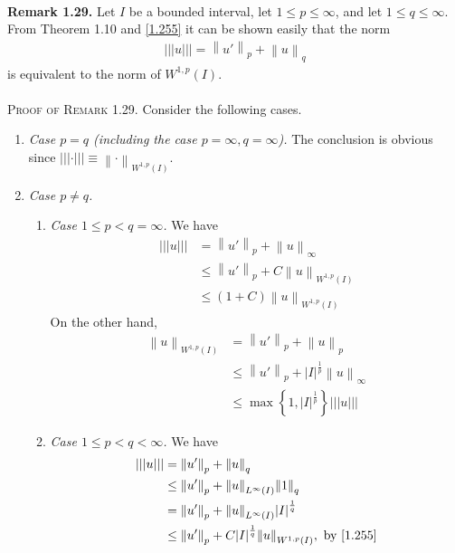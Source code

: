 \documentclass[a4paper,oneside]{book}
\numberwithin{equation}{chapter}
\begin{document}
\\
\textbf{Remark 1.29.} Let $I$ be a bounded interval, let $1\le p\le \infty$, and let $1\le q\le \infty$. From Theorem 1.10 and \eqref{1.255} it can be shown easily that the norm
\begin{align}
|||u||| = {\left\| {u'} \right\|_p} + {\left\| u \right\|_q}
\end{align}
is equivalent to the norm of $W^{1,p}\left(I\right)$.\\
\\
\textsc{Proof of Remark 1.29.} Consider the following cases.
\begin{enumerate}
\item \textit{Case $p=q$ (including the case $p=\infty,q=\infty$).} The conclusion is obvious since $||| \cdot ||| \equiv {\left\|  \cdot  \right\|_{{W^{1,p}}\left( I \right)}}$.
\item \textit{Case $p\ne q$. }
\begin{enumerate}
\item \textit{Case $1 \le p < q = \infty $.} We have
\begin{align}
|||u||| &= {\left\| {u'} \right\|_p} + {\left\| u \right\|_\infty }\\
& \le {\left\| {u'} \right\|_p} + C{\left\| u \right\|_{{W^{1,p}}\left( I \right)}}\\
& \le \left( {1 + C} \right){\left\| u \right\|_{{W^{1,p}}\left( I \right)}}
\end{align}
On the other hand,
\begin{align}
{\left\| u \right\|_{{W^{1,p}}\left( I \right)}} &= {\left\| {u'} \right\|_p} + {\left\| u \right\|_p}\\
& \le {\left\| {u'} \right\|_p} + {\left| I \right|^{\frac{1}{p}}}{\left\| u \right\|_\infty }\\
& \le \max \left\{ {1,{{\left| I \right|}^{\frac{1}{p}}}} \right\}|||u|||
\end{align}
\item \textit{Case $1 \le p < q < \infty$.} We have
\begin{align}
|||u||| &= {\left\| {u'} \right\|_p} + {\left\| u \right\|_q}\\
& \le {\left\| {u'} \right\|_p} + {\left\| u \right\|_{{L^\infty }\left( I \right)}}{\left\| 1 \right\|_q}\\
& = {\left\| {u'} \right\|_p} + {\left\| u \right\|_{{L^\infty }\left( I \right)}}{\left| I \right|^{\frac{1}{q}}}\\
& \le {\left\| {u'} \right\|_p} + C{\left| I \right|^{\frac{1}{q}}}{\left\| u \right\|_{{W^{1,p}}\left( I \right)}},\mbox{ by \eqref{1.255}}\\

\end{align}
\end{enumerate}
\end{enumerate}
\end{document}
